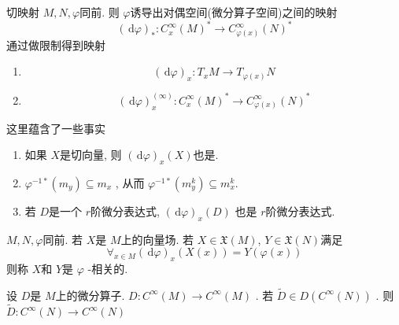 \documentclass[../main.tex]{subfiles}
\begin{document}
\begin{definition}{切映射}{}
     \(  M,N  , \varphi\)同前. 则 \(   \varphi  \)诱导出对偶空间(微分算子空间)之间的映射 \[
     \left( \,\mathrm{d} \varphi \right) _{*} : C^{\infty}_{x}\left( M \right)^{*}\to C^{\infty}_{ \varphi\left( x \right) }\left( N \right)^{*}  
     \]  通过做限制得到映射 
    \begin{enumerate}
      \item \[
      \left( \,\mathrm{d} \varphi \right)_{x}: T_{x}M\to T_{ \varphi\left( x \right) }N 
      \]
      \item \[
      \left( \,\mathrm{d} \varphi \right)_{x}^{\left( \infty \right) } : C^{\infty}_{x}\left( M \right)^{*}\to C^{\infty}_{ \varphi\left( x \right) }\left( N \right)^{*}  
      \]
    \end{enumerate}
    
\end{definition}
\begin{remark}
    这里蕴含了一些事实
    \begin{enumerate}
      \item 如果 \(  X  \)是切向量, 则 \(  \left( \,\mathrm{d} \varphi \right)_{x}\left( X \right)    \)也是.   
      \item \(   \varphi^{-1*}\left( m_{y} \right)\subseteq m_{x}   \) , 从而 \(   \varphi^{-1*}\left( m_{y}^{k} \right)\subseteq m_{x}^{k}   \). 
      \item 若 \(  D  \)是一个 \(  r  \)阶微分表达式, \(  \left( \,\mathrm{d} \varphi \right)_{x}\left( D \right)    \)     也是 \(  r  \)阶微分表达式.  
    \end{enumerate}
    
\end{remark}

\begin{definition}{}{}
    
\(  M,N, \varphi  \)同前. 若 \(  X  \)是 \(  M  \)上的向量场.
    若 \(  X \in \mathfrak{X}\left( M \right)   \), \(  Y \in \mathfrak{X}\left( N \right)   \)满足 \[
    \forall_{x \in M} \left( \,\mathrm{d} \varphi \right)_{x}\left( X\left( x \right)  \right)=Y\left(  \varphi\left( x \right)  \right)   
    \]  则称 \(  X  \)和 \(  Y  \)是 \(   \varphi  \)   -相关的. 
\end{definition}

\begin{lemma}{}{}
     设 \(  D  \)是 \(  M  \)上的微分算子. \(  D: C^{\infty}\left( M \right)\to  C^{\infty}\left( M \right)    \) . 若 \(  \tilde{D}\in D\left( C^{\infty}\left( N \right)  \right)  \) . 则 \(  \tilde{D}: C^{\infty}\left( N \right)\to C^{\infty}\left( N \right)    \)
\end{lemma}
\end{document}
